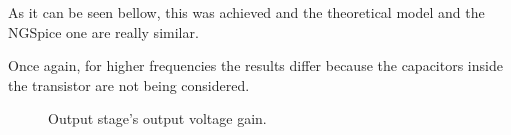 

As it can be seen bellow, this was achieved and the theoretical model and the NGSpice one are really similar.

Once again, for higher frequencies the results differ because the capacitors inside the transistor are not being considered.
 

 
 
 
 
 
 
 
 
 
 
 \begin{figure}[h]
    \centering
{}
  \hfill
{}
\end{figure}

  \begin{figure}[b]
     \centering
     \caption{Output stage's output voltage gain.}
     \label{fig_2_reação_normal}
 \end{figure}
 
 
 
 

